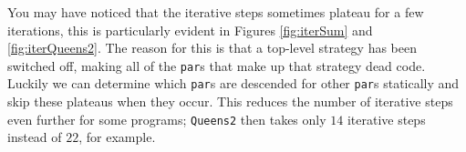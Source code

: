 You may have noticed that the iterative steps sometimes plateau for a few
iterations, this is particularly evident in Figures \ref{fig:iterSum} and
\ref{fig:iterQueens2}. The reason for this is that a top-level strategy has
been switched off, making all of the \verb|par|s that make up that strategy
dead code. Luckily we can determine which \verb|par|s are descended for other
\verb|par|s statically and skip these plateaus when they occur. This reduces
the number of iterative steps even further for some programs; \verb|Queens2|
then takes only $14$ iterative steps instead of $22$, for example.
